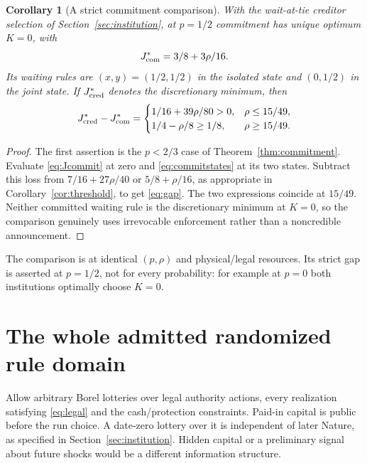 \documentclass[11pt,a4paper]{article}
\numberwithin{equation}{section}
\newtheorem{corollary}[theorem]{Corollary}
\theoremstyle{definition}
\begin{document}
\begin{corollary}[A strict commitment comparison]\label{cor:gap}
With the wait-at-tie creditor selection of Section~\ref{sec:institution},
at \(p=1/2\) commitment has unique optimum \(K=0\), with
\[
 J_{\rm com}^*=3/8+3\rho/16.
\]
Its waiting rules are \((x,y)=(1/2,1/2)\) in the isolated state and
\((0,1/2)\) in the joint state. If \(J_{\rm cred}^*\) denotes the
discretionary minimum, then
\begin{equation}\label{eq:gap}
J_{\rm cred}^*-J_{\rm com}^*=
\begin{cases}
1/16+39\rho/80>0,&\rho\le15/49,\\
1/4-\rho/8\ge1/8,&\rho\ge15/49.
\end{cases}
\end{equation}
\end{corollary}
\begin{proof}
The first assertion is the \(p<2/3\) case of
Theorem~\ref{thm:commitment}. Evaluate \eqref{eq:Jcommit} at zero
and \eqref{eq:commitstates} at its two states. Subtract this loss
from \(7/16+27\rho/40\) or \(5/8+\rho/16\), as appropriate in
Corollary~\ref{cor:threshold}, to get \eqref{eq:gap}. The two
expressions coincide at \(15/49\). Neither committed waiting rule is
the discretionary minimum at \(K=0\), so the comparison genuinely
uses irrevocable enforcement rather than a noncredible announcement.
\end{proof}

The comparison is at identical \((p,\rho)\) and physical/legal resources.
Its strict gap is asserted at \(p=1/2\), not for every probability:
for example at \(p=0\) both institutions optimally choose \(K=0\).

\section{The whole admitted randomized rule domain}\label{sec:random}

Allow arbitrary Borel lotteries over legal authority actions, every
realization satisfying \eqref{eq:legal} and the cash/protection constraints.
Paid-in capital is public before the run choice. A date-zero lottery
over it is independent of later Nature, as specified in
Section~\ref{sec:institution}. Hidden capital or a preliminary signal
about future shocks would be a different information structure.
\end{document}
